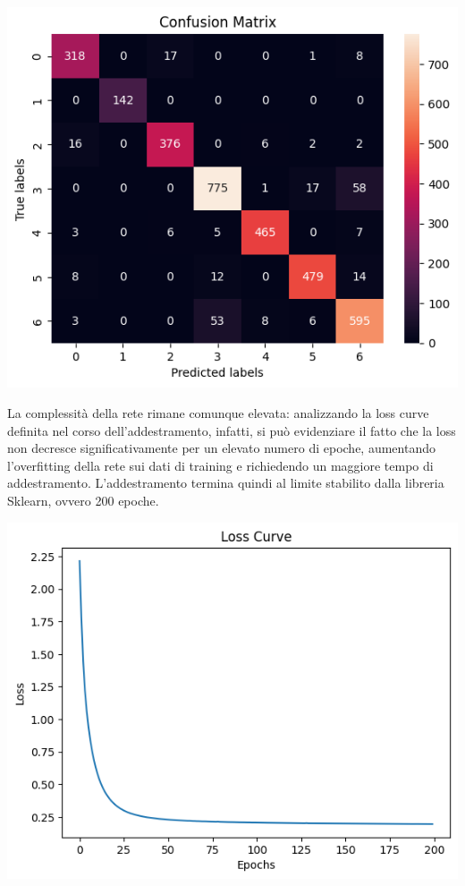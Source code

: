 \begin{Figure}
    \centering
    \includegraphics[width=\linewidth]{img/mlp_low_confusion_matrix.png}
\end{Figure}

La complessità della rete rimane comunque elevata: analizzando la loss curve
definita nel corso dell'addestramento, infatti, si può evidenziare il fatto
che la loss non decresce significativamente per un elevato numero di epoche,
aumentando l'overfitting della rete sui dati di training e richiedendo un maggiore
tempo di addestramento. L'addestramento termina quindi al limite stabilito
dalla libreria Sklearn, ovvero 200 epoche.

\begin{Figure}
    \centering
    \includegraphics[width=0.9\linewidth]{img/mlp_low_loss.png}
\end{Figure}

